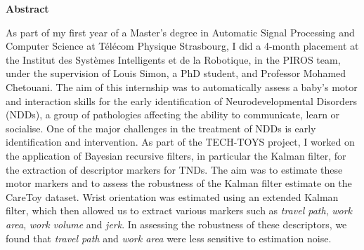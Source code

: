 \documentclass[5pt]{article}
\begin{document}



\newpage
\pagestyle{empty}
\clearpage

\Large \textbf{Abstract}
\par 
As part of my first year of a Master's degree in Automatic Signal Processing and Computer Science at Télécom Physique Strasbourg, I did a 4-month placement at the Institut des Systèmes Intelligents et de la Robotique, in the PIROS team, under the supervision of Louis Simon, a PhD student, and Professor Mohamed Chetouani. The aim of this internship was to automatically assess a baby's motor and interaction skills for the early identification of Neurodevelopmental Disorders (NDDs), a group of pathologies affecting the ability to communicate, learn or socialise. One of the major challenges in the treatment of NDDs is early identification and intervention. As part of the TECH-TOYS project, I worked on the application of Bayesian recursive filters, in particular the Kalman filter, for the extraction of descriptor markers for TNDs. The aim was to estimate these motor markers and to assess the robustness of the Kalman filter estimate on the CareToy dataset. Wrist orientation was estimated using an extended Kalman filter, which then allowed us to extract various markers such as \textit{travel path}, \textit{work area}, \textit{work volume} and \textit{jerk}. In assessing the robustness of these descriptors, we found that \textit{travel path} and \textit{work area} were less sensitive to estimation noise.
\end{document}
